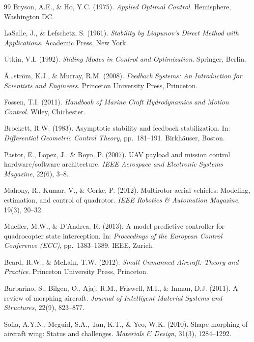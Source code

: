 ﻿\documentclass[12pt,a4paper]{article}
\theoremstyle{remark}
\begin{document}
\begin{thebibliography}{99}
		Bryson, A.E., \& Ho, Y.C. (1975). \textit{Applied Optimal Control}. Hemisphere, Washington DC.

		LaSalle, J., \& Lefschetz, S. (1961). \textit{Stability by Liapunov's Direct Method with Applications}. Academic Press, New York.

		Utkin, V.I. (1992). \textit{Sliding Modes in Control and Optimization}. Springer, Berlin.

		Ã…ström, K.J., \& Murray, R.M. (2008). \textit{Feedback Systems: An Introduction for Scientists and Engineers}. Princeton University Press, Princeton.

		Fossen, T.I. (2011). \textit{Handbook of Marine Craft Hydrodynamics and Motion Control}. Wiley, Chichester.

		Brockett, R.W. (1983). Asymptotic stability and feedback stabilization. In: \textit{Differential Geometric Control Theory}, pp.~181--191. Birkhäuser, Boston.


		Pastor, E., Lopez, J., \& Royo, P. (2007). UAV payload and mission control hardware/software architecture. \textit{IEEE Aerospace and Electronic Systems Magazine}, 22(6), 3--8.

		Mahony, R., Kumar, V., \& Corke, P. (2012). Multirotor aerial vehicles: Modeling, estimation, and control of quadrotor. \textit{IEEE Robotics \& Automation Magazine}, 19(3), 20--32.

		Mueller, M.W., \& D'Andrea, R. (2013). A model predictive controller for quadrocopter state interception. In: \textit{Proceedings of the European Control Conference (ECC)}, pp.~1383--1389. IEEE, Zurich.

		Beard, R.W., \& McLain, T.W. (2012). \textit{Small Unmanned Aircraft: Theory and Practice}. Princeton University Press, Princeton.


		Barbarino, S., Bilgen, O., Ajaj, R.M., Friswell, M.I., \& Inman, D.J. (2011). A review of morphing aircraft. \textit{Journal of Intelligent Material Systems and Structures}, 22(9), 823--877.

		Sofla, A.Y.N., Meguid, S.A., Tan, K.T., \& Yeo, W.K. (2010). Shape morphing of aircraft wing: Status and challenges. \textit{Materials \& Design}, 31(3), 1284--1292.


\end{thebibliography}
\end{document}
